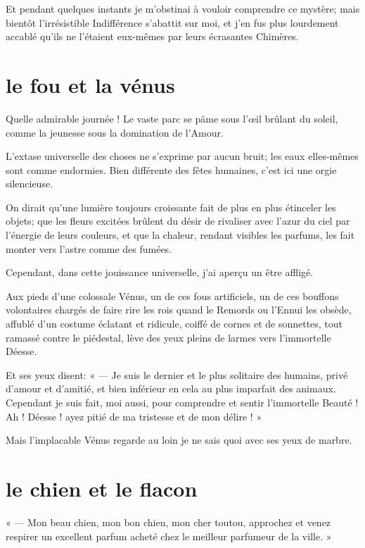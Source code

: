 Et pendant quelques instants je m’obstinai à vouloir
comprendre ce mystère; mais bientôt l’irrésistible
Indifférence s’abattit sur moi, et
j’en fus plus lourdement accablé
qu’ils ne l’étaient eux{}-mêmes par
leurs écrasantes Chimères.

\quebra\section[Le fou et la vénus]{le fou et la vénus }

Quelle admirable journée ! Le vaste parc se pâme sous
l’\oe il brûlant du soleil, comme la jeunesse sous la
domination de l’Amour.

L’extase universelle des choses ne
s’exprime par aucun bruit; les eaux elles{}-mêmes sont
comme endormies. Bien différente des fêtes humaines,
c’est ici une orgie silencieuse.

On dirait qu’une lumière toujours croissante fait de
plus en plus étinceler les objets; que les fleurs excitées brûlent du
désir de rivaliser avec l’azur du ciel par
l’énergie de leurs couleurs, et que la chaleur,
rendant visibles les parfums, les fait monter vers
l’astre comme des fumées.

Cependant, dans cette jouissance universelle, j’ai
aperçu un être affligé.

Aux pieds d’une colossale Vénus, un de ces fous
artificiels, un de ces bouffons volontaires chargés de faire rire les
rois quand le Remords ou l’Ennui les obsède, affublé
d’un costume éclatant et ridicule, coiffé de cornes et
de sonnettes, tout ramassé contre le piédestal, lève des yeux pleins de
larmes vers l’immortelle Déesse.

Et ses yeux disent: « --- Je suis le dernier et le plus solitaire des
humains, privé d’amour et d’amitié,
et bien inférieur en cela au plus imparfait des animaux. Cependant je
suis fait, moi aussi, pour comprendre et sentir
l’immortelle Beauté ! Ah ! Déesse ! ayez pitié de ma
tristesse et de mon délire ! »

Mais l’implacable Vénus regarde au loin je ne sais quoi
avec ses yeux de marbre.

\quebra\section[Le chien et le flacon]{le chien et le flacon }

« --- Mon beau chien, mon bon chien, mon cher toutou, approchez et venez
respirer un excellent parfum acheté chez le meilleur parfumeur de la
ville. »

